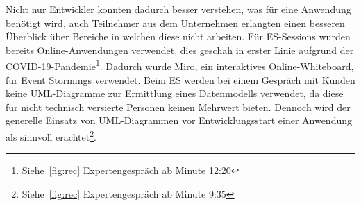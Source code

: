 Nicht nur Entwickler konnten dadurch besser verstehen, was für eine Anwendung benötigt wird, auch Teilnehmer aus dem Unternehmen erlangten
einen besseren Überblick über Bereiche in welchen diese nicht arbeiten.\newline
Für \ac{ES}-Sessions wurden bereits Online-Anwendungen verwendet, dies geschah in erster Linie aufgrund der COVID-19-Pandemie\footnote{Siehe~\ref{fig:rec} Expertengespräch ab Minute  12:20}.
Dadurch wurde Miro, ein interaktives Online-Whiteboard, für Event Stormings verwendet.\newline
Beim \ac{ES} werden bei einem Gespräch mit Kunden keine UML-Diagramme zur Ermittlung eines Datenmodells verwendet,
da diese für nicht technisch versierte Personen keinen Mehrwert bieten.
Dennoch wird der generelle Einsatz von UML-Diagrammen vor Entwicklungsstart einer Anwendung als sinnvoll erachtet\footnote{Siehe~\ref{fig:rec} Expertengespräch ab Minute  9:35}.

